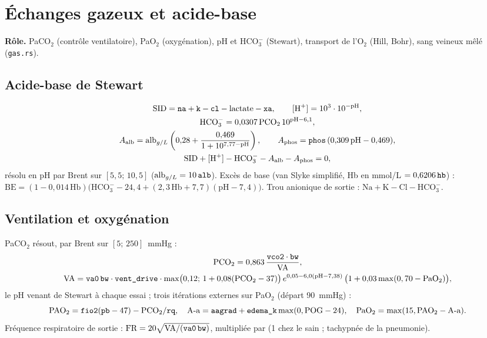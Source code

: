 \documentclass[10pt,a4paper]{article}
\newcommand{\cmd}[1]{\texttt{#1}}
\newcommand{\vp}[1]{\text{\texttt{\detokenize{#1}}}}
\begin{document}
\section{Échanges gazeux et acide-base}\label{sec:gaz}

\textbf{Rôle.} PaCO$_2$ (contrôle ventilatoire), PaO$_2$ (oxygénation), pH et HCO$_3^-$ (Stewart), transport de l'O$_2$ (Hill, Bohr), sang veineux mêlé (\cmd{gas.rs}).

\subsection{Acide-base de Stewart}
\begin{gather}
\text{SID} = \vp{na} + \vp{k} - \vp{cl} - \text{lactate} - \vp{xa},\qquad [\text{H}^+] = 10^3\cdot 10^{-\text{pH}},\\
\text{HCO}_3^- = 0{,}0307\,\text{PCO}_2\,10^{\text{pH} - 6{,}1},\\
A_\text{alb} = \text{alb}_{g/L}\left(0{,}28 + \frac{0{,}469}{1 + 10^{7{,}77 - \text{pH}}}\right),\qquad A_\text{phos} = \vp{phos}\,(0{,}309\,\text{pH} - 0{,}469),\\
\text{SID} + [\text{H}^+] - \text{HCO}_3^- - A_\text{alb} - A_\text{phos} = 0,
\end{gather}
résolu en pH par Brent sur $[5{,}5;\,10{,}5]$ ($\text{alb}_{g/L} = 10\,\vp{alb}$). Excès de base (van Slyke simplifié, Hb en mmol/L $= 0{,}6206\,\vp{hb}$) : $\text{BE} = (1 - 0{,}014\,\text{Hb})\bigl(\text{HCO}_3^- - 24{,}4 + (2{,}3\,\text{Hb} + 7{,}7)(\text{pH} - 7{,}4)\bigr)$. Trou anionique de sortie : $\text{Na} + \text{K} - \text{Cl} - \text{HCO}_3^-$.

\subsection{Ventilation et oxygénation}
PaCO$_2$ résout, par Brent sur $[5;\,250]$~mmHg :
\begin{gather}
\text{PCO}_2 = 0{,}863\,\frac{\vp{vco2}\cdot\vp{bw}}{\text{VA}},\\
\text{VA} = \vp{va0}\,\vp{bw}\cdot\vp{vent_drive}\cdot\max\bigl(0{,}12;\,1 + 0{,}08(\text{PCO}_2 - 37)\bigr)\,e^{0{,}05 - 6{,}0(\text{pH} - 7{,}38)}\,\bigl(1 + 0{,}03\max(0, 70 - \text{PaO}_2)\bigr),
\end{gather}
le pH venant de Stewart à chaque essai ; trois itérations externes sur PaO$_2$ (départ 90~mmHg) :
\begin{equation}
\text{PAO}_2 = \vp{fio2}(\vp{pb} - 47) - \text{PCO}_2/\vp{rq},\quad
\text{A-a} = \vp{aagrad} + \vp{edema_k}\max(0, \text{POG} - 24),\quad
\text{PaO}_2 = \max(15, \text{PAO}_2 - \text{A-a}).
\end{equation}
Fréquence respiratoire de sortie : $\text{FR} = 20\sqrt{\text{VA}/(\vp{va0}\,\vp{bw})}$, multipliée par \vp{rr_mult} (1 chez le sain ; tachypnée de la pneumonie).
\end{document}
